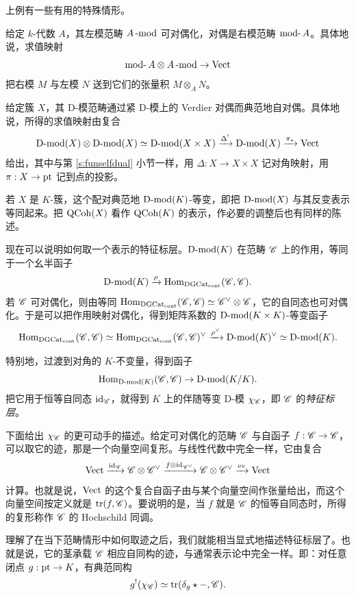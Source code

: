 上例有一些有用的特殊情形。

\begin{ex} 给定 $k$-代数 $A$，其左模范畴 $A\mod$ 可对偶化，对偶是右模范畴 $\on{mod-}A$。具体地说，求值映射
%
\[
   \rmod A \otimes A\mod \rightarrow \Vect
\]
%
把右模 $M$ 与左模 $N$ 送到它们的张量积 $M
\otimes_A N$。
\end{ex}

\begin{ex} \label{ex:dmodselfdual}给定簇 $X$，其 D-模范畴通过紧 D-模上的 Verdier 对偶而典范地自对偶。具体地说，所得的求值映射由复合
%
\[
 \Dmod(X) \otimes \Dmod(X) \simeq \Dmod(X \times X) \xrightarrow{\Delta^!}
 \Dmod(X) \xrightarrow{\pi_*} \Vect
\]
%
给出，其中与第 \ref{s:funselfdual} 小节一样，用 $\Delta: X
\rightarrow X \times X$ 记对角映射，用 $\pi: X \rightarrow \on{pt}$ 记到点的投影。

若 $X$ 是 $K$-簇，这个配对典范地 $\Dmod(K)$-等变，即把 $\Dmod(X)$ 与其反变表示等同起来。把 $\QCoh(X)$ 看作 $\QCoh(K)$ 的表示，作必要的调整后也有同样的陈述。
\end{ex}

\ssszh[特征标层] 现在可以说明如何取一个表示的特征标层。$\Dmod(K)$ 在范畴 $\sC$ 上的作用，等同于一个幺半函子
%
\[
\Dmod(K) \xrightarrow{\rho} \udHom(\sC, \sC).
\]
%
若 $\sC$ 可对偶化，则由等同 $\udHom(\sC, \sC) \simeq
\sC^\vee \otimes \sC$，它的自同态也可对偶化。于是可以把作用映射对偶化，得到矩阵系数的 $\Dmod(K \times K)$-等变函子
%
\[
   \udHom(\sC, \sC) \simeq \udHom(\sC, \sC)^\vee \xrightarrow{\rho^\vee}
   \Dmod(K)^\vee \simeq \Dmod(K).
\]
%

特别地，过渡到对角的 $K$-不变量，得到函子
%
\begin{equation} \label{e:mcequivfunc}
   \Hom_{\Dmod(K)}(\sC, \sC) \rightarrow \Dmod(K / K ).
\end{equation}
%
把它用于恒等自同态 $\id_{\sC}$，就得到 $K$ 上的伴随等变 D-模 $\chi_\sC$，即 $\sC$ 的\emph{特征标层}。

\ssszh 下面给出 $\chi_\sC$ 的更可动手的描述。给定可对偶化的范畴 $\sC$ 与自函子 $f: \sC \rightarrow \sC$，可以取它的迹，那是一个向量空间复形。与线性代数中完全一样，它由复合
%
\[
\Vect \xrightarrow{\id_{\sC}} \sC \otimes \sC^\vee \xrightarrow{f \otimes
\on{id}_{\sC^\vee}} \sC \otimes \sC^\vee \xrightarrow{\on{ev}} \Vect
\]
%
计算。也就是说，$\Vect$ 的这个复合自函子由与某个向量空间作张量给出，而这个向量空间按定义就是 $\on{tr}(f, \sC)$。要说明的是，当 $f$ 就是 $\sC$ 的恒等自同态时，所得的复形称作 $\sC$ 的 Hochschild 同调。

理解了在当下范畴情形中如何取迹之后，我们就能相当显式地描述特征标层了。也就是说，它的茎承载 $\sC$ 相应自同构的迹，与通常表示论中完全一样。即：对任意闭点 $g: \pt \rightarrow K$，有典范同构
%
\[
     g^!(\chi_\sC) \simeq \on{tr}( \delta_g \star -, \sC).
\]
%

